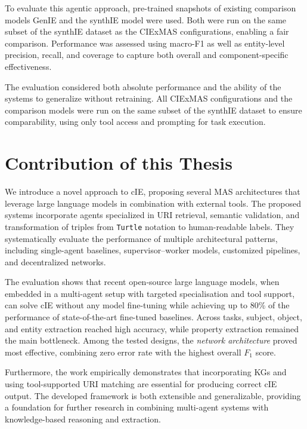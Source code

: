 \documentclass[a4paper,oneside,bibliography=totoc]{scrbook}
\begin{document}
To evaluate this agentic approach, pre-trained snapshots of existing comparison models GenIE and the synthIE model were used. Both were run on the same subset of the synthIE dataset as the CIExMAS configurations, enabling a fair comparison. Performance was assessed using macro-F1 as well as entity-level precision, recall, and coverage to capture both overall and component-specific effectiveness.

The evaluation considered both absolute performance and the ability of the systems to generalize without retraining. All CIExMAS configurations and the comparison models were run on the same subset of the synthIE dataset to ensure comparability, using only tool access and prompting for task execution.

\section{Contribution of this Thesis}
\label{sec:contribution}

We introduce a novel approach to \ac{cIE}, proposing several \ac{MAS} architectures that leverage large language models in combination with external tools. The proposed systems incorporate agents specialized in \ac{URI} retrieval, semantic validation, and transformation of triples from \texttt{Turtle} notation to human-readable labels. They systematically evaluate the performance of multiple architectural patterns, including single-agent baselines, supervisor–worker models, customized pipelines, and decentralized networks.

The evaluation shows that recent open-source large language models, when embedded in a multi-agent setup with targeted specialisation and tool support, can solve \ac{cIE} without any model fine-tuning while achieving up to 80\% of the performance of state-of-the-art fine-tuned baselines. Across tasks, subject, object, and entity extraction reached high accuracy, while property extraction remained the main bottleneck. Among the tested designs, the \textit{network architecture} proved most effective, combining zero error rate with the highest overall $F_{1}$ score.

Furthermore, the work empirically demonstrates that incorporating \acp{KG} and using tool-supported \ac{URI} matching are essential for producing correct \ac{cIE} output. The developed framework is both extensible and generalizable, providing a foundation for further research in combining multi-agent systems with knowledge-based reasoning and extraction.
\end{document}
